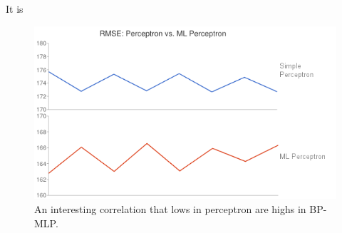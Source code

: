 It is 
\begin{figure}[center]
	\centering
	\includegraphics[width=12cm]{images/chart10.png}
	\caption{An interesting correlation that lows in perceptron are highs in BP-MLP.}
	\label{fig:perceptron_vs_bp}
\end{figure}


%





